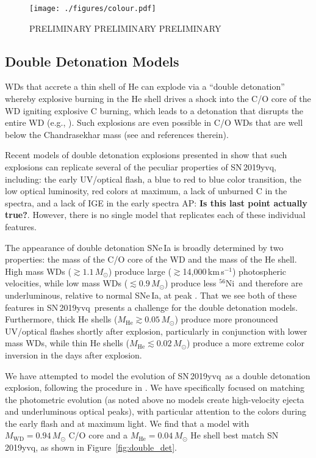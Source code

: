 \documentclass[twocolumn]{aastex63}
\newcommand{\abi}[1]{{\color{LincolnGreen} AP: \textbf{#1}}}
\newcommand{\kms}{km\,s$^{-1}$}
\newcommand{\radni}{$^{56}$Ni}
\newcommand{\sn}{SN\,2019yvq}
\begin{document}
\begin{figure}
    \centering
    \texttt{[image: ./figures/colour.pdf]}
    \caption{PRELIMINARY PRELIMINARY PRELIMINARY}
    \label{fig:Ni_bullet}
\end{figure}

\subsection{Double Detonation Models}

WDs that accrete a thin shell of He can explode via a ``double detonation''
whereby explosive burning in the He shell drives a shock into the C/O core of
the WD igniting explosive C burning, which leads to a detonation that
disrupts the entire WD (e.g., \citealt{Nomoto82,Nomoto82a,Woosley94}). Such
explosions are even possible in C/O WDs that are well below the Chandrasekhar
mass (see \citealt{Fink07, Fink10} and references therein).

Recent models of double detonation explosions presented in \citet{Polin19}
show that such explosions can replicate several of the peculiar properties of
\sn, including: the early UV/optical flash, a blue to red to blue color
transition, the low optical luminosity, red colors at maximum, a lack of
unburned C in the spectra, and a lack of IGE in the early spectra \abi{Is
this last point actually true?}. However, there is no single model that
replicates each of these individual features.

The appearance of double detonation SNe\,Ia is broadly determined by two
properties: the mass of the C/O core of the WD and the mass of the He shell.
High mass WDs ($\gtrsim 1.1\,M_\odot$) produce large ($\gtrsim$14,000\,\kms)
photospheric velocities, while low mass WDs ($\lesssim 0.9\,M_\odot$) produce
less \radni\ and therefore are underluminous, relative to normal SNe\,Ia, at
peak \citep{Polin19}. That we see both of these features in \sn\ presents a
challenge for the \citet{Polin19} double detonation models. Furthermore,
thick He shells ($M_\mathrm{He} \gtrsim 0.05\,M_\odot$) produce more
pronounced UV/optical flashes shortly after explosion, particularly in
conjunction with lower mass WDs, while thin He shells ($M_\mathrm{He}
\lesssim 0.02\,M_\odot$) produce a more extreme color inversion in the days
after explosion.

We have attempted to model the evolution of \sn\ as a double detonation
explosion, following the procedure in \citet{Polin19}. We have specifically
focused on matching the photometric evolution (as noted above no models
create high-velocity ejecta and underluminous optical peaks), with particular
attention to the colors during the early flash and at maximum light. We find
that a model with $M_\mathrm{WD} = 0.94\,M_\odot$ C/O core and a
$M_\mathrm{He} = 0.04\,M_\odot$ He shell best match \sn, as shown in
Figure~\ref{fig:double_det}.
\end{document}
